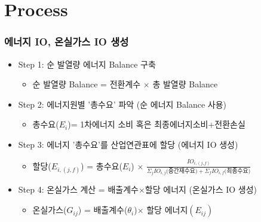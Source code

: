 \documentclass[10pt,compress,slidetop,%
			   hyperref={unicode},xcolor={svgnames},%
			   t]{beamer}
\begin{document}
\section{Process}
%
\begin{frame}
	\frametitle{에너지 IO, 온실가스 IO 생성}
	\begin{itemize}
	\item{Step 1: 순 발열량 에너지 Balance 구축}
	\bigskip
		\begin{itemize}
		\item{ 순 발열량 Balance = 전환계수 $\times$ 총 발열량 Balance}
		\end{itemize}
	\bigskip
	\item{Step 2: 에너지원별 '총수요' 파악 (순 에너지 Balance 사용)}
	\bigskip
		\begin{itemize}
		\item{ 총수요($E_i$)= 1차에너지 소비 혹은 최종에너지소비+전환손실}
		\end{itemize}
	\bigskip
	\item{Step 3: 에너지 '총수요'를 산업연관표에 할당 (에너지 IO 생성)}
         \begin{itemize}
		\item{ 할당($E_{i,(j,f)}$) = 총수요($E_i$) $\times$ $\frac{IO_{i,(j,f)}}{\Sigma_j IO_{i,j}\mbox{(중간재수요)}+\Sigma_f IO_{i,f}\mbox{(최종수요)}}$}
		\end{itemize}
	\bigskip
	\item{Step 4: 온실가스 계산 = 배출계수$\times$할당 에너지 (온실가스 IO 생성)}
		\begin{itemize}
		\item{ 온실가스($G_{ij}$) = 배출계수($\theta_i$)$\times$ 할당 에너지$(E_{ij})$}
		\end{itemize}
	\end{itemize}
	
\end{frame}
%
\end{document}

